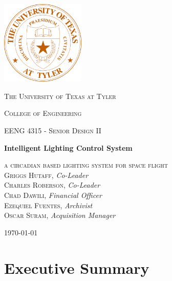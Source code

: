 \documentclass[12pt,a4paper]{report}
\begin{document}
\begin{titlepage}

	\centering
	\includegraphics[width=0.3\textwidth]{uttseal.png}\par\vspace{0.1cm}
	{\scshape\LARGE The University of Texas at Tyler\par}
	\vspace{0.1cm}
	{\scshape\LARGE College of Engineering\par}
	\vspace{1cm}
	{\scshape\Large EENG 4315 - Senior Design II\par}
	\vspace{1cm}
	{\huge\bfseries Intelligent Lighting Control System\par}
	\vspace{2cm}
	\textsc{a circadian based lighting system for space flight}\\
	\vspace{1cm}
	\textsc{Griggs Hutaff},  \textit{Co-Leader}\\
	\textsc{Charles Roberson},  \textit{Co-Leader}\\
	\textsc{Chad Dawili},  \textit{Financial Officer}\\
	\textsc{Ezequiel Fuentes},  \textit{Archivist}\\
	\textsc{Oscar Suram},  \textit{Acquisition Manager}
	\vfill

	{\large \today\par}
\end{titlepage}
\section*{Executive Summary}
\thispagestyle{empty}
\blindtext
\newpage
\tableofcontents
\thispagestyle{empty}
\listoffigures
\thispagestyle{empty}
\listoftables
\thispagestyle{empty}
\newpage
\setcounter{page}{1}
\end{document}
